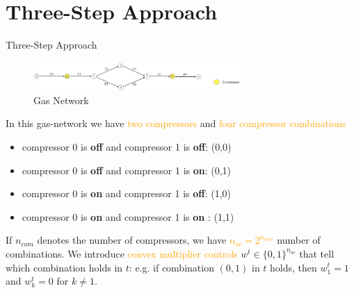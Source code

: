 \documentclass[8pt]{beamer}
\begin{document}
\section{Three-Step Approach}
\begin{frame}{Three-Step Approach}
\begin{figure}
\centering
\includegraphics[width=0.7\textwidth]{images/AdvancedNetwork2}
\caption{Gas Network}
\end{figure}
In this gas-network we have \textcolor{orange}{two compressors} and \textcolor{orange}{four compressor combinations}
\begin{itemize}
\item compressor 0 is \textbf{off} and  compressor 1 is \textbf{off}: (0,0)
\item compressor 0 is \textbf{off}  and  compressor 1 is \textbf{on}: (0,1)
\item compressor 0 is \textbf{on}  and  compressor 1 is \textbf{off}: (1,0)
\item compressor 0 is \textbf{on}  and  compressor 1 is \textbf{on} : (1,1)
\end{itemize} 
If $n_{com}$ denotes the number of compressors, we have \textcolor{orange}{$n_{oc}= 2^{n_{com}}$} number of combinations. \newline
We introduce \textcolor{orange}{convex multiplier controls} $w^t \in \{0,1\}^{n_{oc}}$ that tell which combination holds in $t$:  e.g. if combination $(0,1)$ in $t$ holds,  then $w_1^t=1$ and $w_k^t=0$ for $k \neq 1$. 
\end{frame}
\end{document}
